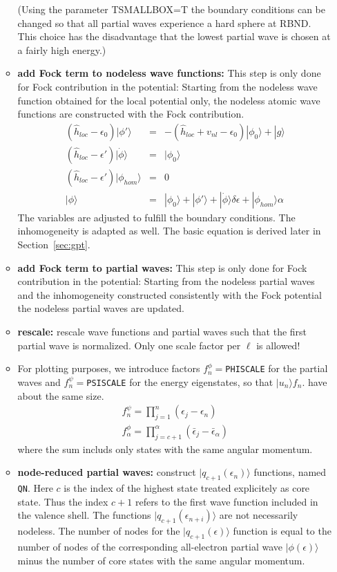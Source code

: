 \documentclass[11pt,a4paper]{report}
\begin{document}
\begin{enumerate}
\begin{itemize}
  (Using the parameter TSMALLBOX=T the boundary conditions can be
  changed so that all partial waves experience a hard sphere at
  RBND. This choice has the disadvantage that the lowest partial wave
  is chosen at a fairly high energy.)
%
\item \textbf{add Fock term to nodeless wave functions:} This step is
  only done for Fock contribution in the potential: Starting from the
  nodeless wave function obtained for the local potential only, the
  nodeless atomic wave functions are constructed with the Fock
  contribution.
  \begin{eqnarray*}
  \left(\hat{h}_{loc}-\epsilon_0\right)|\phi'\rangle&=&
  -\left(\hat{h}_{loc}+v_{nl}-\epsilon_0\right)|\phi_0\rangle+|g\rangle
\\
  \left(\hat{h}_{loc}-\epsilon'\right)|\dot{\phi}\rangle&=&|\phi_0\rangle
\\
  \left(\hat{h}_{loc}-\epsilon'\right)|\phi_{hom}\rangle&=&0
\\
|\phi\rangle&=&|\phi_0\rangle+|\phi'\rangle
+|\dot{\phi}\rangle\delta\epsilon+|\phi_{hom}\rangle\alpha
  \end{eqnarray*}
  The variables are adjusted to fulfill the boundary conditions.  The
  inhomogeneity is adapted as well.  The basic equation is derived
  later in Section~\ref{sec:gpt}.
%
\item \textbf{add Fock term to partial waves:} This step is only done
  for Fock contribution in the potential: Starting from the nodeless
  partial waves and the inhomogeneity constructed consistently with
  the Fock potential the nodeless partial waves are updated.
%
\item \textbf{rescale:} rescale wave functions and partial waves such
  that the first partial wave is normalized. Only one scale factor per
  $\ell$ is allowed!
%
\item For plotting purposes, we introduce factors
  $f^\phi_n=$\verb|PHISCALE| for the partial waves and
  $f^\psi_n=$\verb|PSISCALE| for the energy eigenstates, so that
  $|u_n\rangle f_n$. have about the same size.
   \begin{eqnarray*}
    f^{\psi}_n=\prod_{j=1}^n(\epsilon_j-\epsilon_n)
   \\
    f^{\phi}_\alpha=\prod_{j=c+1}^\alpha(\bar{\epsilon}_j-\bar{\epsilon}_\alpha)
  \end{eqnarray*}
   where the sum includs only states with the same angular momentum.
%
\item \textbf{node-reduced partial waves:} construct
  $|q_{c+1}(\epsilon_{n})\rangle$ functions, named \verb|QN|. Here
  $c$ is the index of the highest state treated explicitely as core
  state. Thus the index $c+1$ refers to the first wave function
  included in the valence shell. The functions
  $|q_{c+1}(\epsilon_{n+i})\rangle$ are not necessarily nodeless.  The
  number of nodes for the $|q_{c+1}(\epsilon)\rangle$ function is
  equal to the number of nodes of the corresponding all-electron
  partial wave $|\phi(\epsilon)\rangle$ minus the number of core
  states with the same angular momentum.


\end{itemize}
\end{enumerate}
\end{document}
